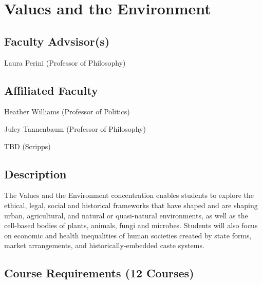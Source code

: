\documentclass{article}\usepackage[]{graphicx}\usepackage[]{xcolor}
\newenvironment{itemize*}%
  {\begin{itemize}%
    \setlength{\itemsep}{0pt}%
    \setlength{\parskip}{0pt}}%
  {\end{itemize}}
\begin{document}
\newpage
\section{Values and the Environment}



\subsection{Faculty Advsisor(s)}

\begin{itemize*}
  \item Laura Perini (Professor of Philosophy)
\end{itemize*}

\subsection{Affiliated Faculty}

\begin{itemize*}
  \item Heather Williams (Professor of Politics)
  \item Juley Tannenbaum (Professor of Philosophy)
  \item TBD (Scripps)
\end{itemize*}

\subsection{Description}

The Values and the Environment concentration enables students to explore the ethical, legal, social and historical frameworks that have shaped and are shaping urban, agricultural, and natural or quasi-natural environments, as well as the cell-based bodies of plants, animals, fungi and microbes. Students will also focus on economic and health inequalities of human societies created by state forms, market arrangements, and historically-embedded caste systems.

\subsection{Course Requirements (12 Courses)}
\end{document}
